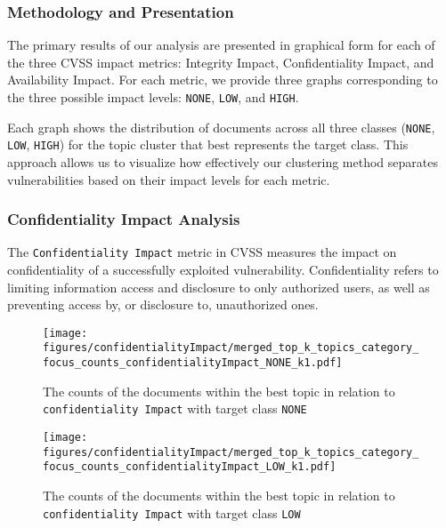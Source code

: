 \subsubsection{Methodology and Presentation}

The primary results of our analysis are presented in graphical form for each of the three CVSS impact metrics: Integrity Impact, Confidentiality Impact, and Availability Impact. For each metric, we provide three graphs corresponding to the three possible impact levels: \texttt{NONE}, \texttt{LOW}, and \texttt{HIGH}.

Each graph shows the distribution of documents across all three classes (\texttt{NONE}, \texttt{LOW}, \texttt{HIGH}) for the topic cluster that best represents the target class. This approach allows us to visualize how effectively our clustering method separates vulnerabilities based on their impact levels for each metric.


\subsubsection{Confidentiality Impact Analysis}

The \texttt{Confidentiality Impact} metric in CVSS measures the impact on confidentiality of a successfully exploited vulnerability. Confidentiality refers to limiting information access and disclosure to only authorized users, as well as preventing access by, or disclosure to, unauthorized ones.

\begin{figure}[t]
	\begin{center}
		\texttt{[image: figures/confidentialityImpact/merged\_top\_k\_topics\_category\_focus\_counts\_confidentialityImpact\_NONE\_k1.pdf]}
	\end{center}

	\caption{The counts of the documents within the best topic in relation to \texttt{confidentiality Impact} with target class \texttt{NONE}}
	\label{fig:confidentialityImpact_60_NONE}

\end{figure}

\begin{figure}[t]
	\begin{center}
		\texttt{[image: figures/confidentialityImpact/merged\_top\_k\_topics\_category\_focus\_counts\_confidentialityImpact\_LOW\_k1.pdf]}
	\end{center}
	\caption{The counts of the documents within the best topic in relation to \texttt{confidentiality Impact} with target class \texttt{LOW}}
	\label{fig:confidentialityImpact_60_LOW}

\end{figure}

